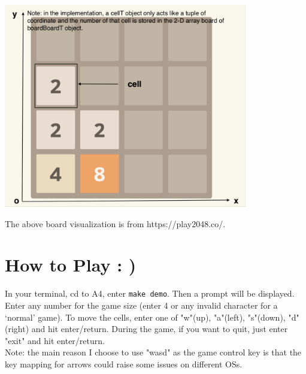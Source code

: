 \documentclass[12pt]{article}
\begin{document}
\begin{center}
  \includegraphics[width=0.8\textwidth]{data_structure.png}

  The above board visualization is from https://play2048.co/.
\end{center}

\newpage
\section*{How to Play : )}
In your terminal, cd to A4, enter \verb|make demo|. Then a prompt will be displayed. Enter any number for the game size (enter 4 or any invalid character for a `normal' game). To move the cells, enter one of "w"(up), "a"(left), "s"(down), "d"(right) and hit enter/return. During the game, if you want to quit, just enter "exit" and hit enter/return.\\

\noindent
Note: the main reason I choose to use "wasd" as the game control key is that the key mapping for arrows could raise some issues on different OSs.\\
\end{document}
